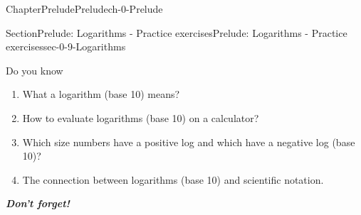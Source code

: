 \documentclass[twoside,11pt,]{book}
\newcommand{\alert}[1]{\textbf{\textit{#1}}}
\numberwithin{equation}{section}
\begin{document}
\begin{chapterptx}{Chapter}{Prelude}{}{Prelude}{}{}{ch-0-Prelude}
\begin{sectionptx}{Section}{Prelude: Logarithms - Practice exercises}{}{Prelude: Logarithms - Practice exercises}{}{}{sec-0-9-Logarithms}
\begin{conclusion}{Do you know \textellipsis{}}%
%
\begin{enumerate}[label={\Alph*.}]
\item{}What a logarithm (base 10) means?%
\item{}How to evaluate logarithms (base 10) on a calculator?%
\item{}Which size numbers have a positive log and which have a negative log (base 10)?%
\item{}The connection between logarithms (base 10) and scientific notation.%
\end{enumerate}
%
\par
\alert{Don't forget!}%
\end{conclusion}%
\end{sectionptx}
\end{chapterptx}
%
%
\typeout{************************************************}
\typeout{************************************************}
%
\end{document}
